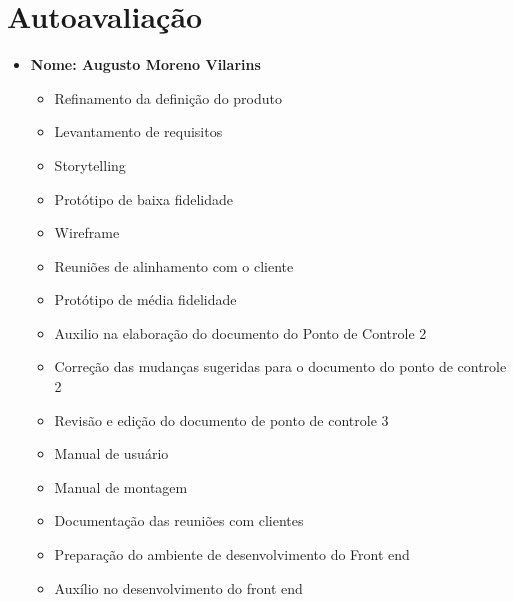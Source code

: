 \chapter[Autoavaliação]{Autoavaliação}
\label{autoavaliacao}

\begin{itemize}

    
    \item \textbf{Nome: Augusto Moreno Vilarins}
    \begin{itemize}
    \item Refinamento da definição do produto
    \item Levantamento de requisitos
    \item Storytelling
    \item Protótipo de baixa fidelidade
    \item Wireframe
    \item Reuniões de alinhamento com o cliente
    \item Protótipo de média fidelidade
    \item Auxilio na elaboração do documento do Ponto de Controle 2
    \item Correção das mudanças sugeridas para o documento do ponto de controle 2
    \item Revisão e edição do documento de ponto de controle 3
    \item Manual de usuário
    \item Manual de montagem
    \item Documentação das reuniões com clientes
    \item Preparação do ambiente de desenvolvimento do Front end
    \item Auxílio no desenvolvimento do front end
    \end{itemize}
    

\end{itemize}
